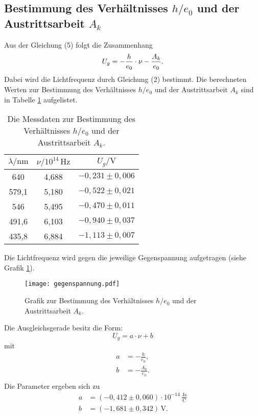\subsection{Bestimmung des Verhältnisses $h/e_0$ und der Austrittsarbeit $A_k$}
Aus der Gleichung (5) folgt die Zusammenhang
\begin{equation}
  U_g= -\frac{h}{e_0}\cdot \nu -\frac{A_k}{e_0}.\\
\end{equation}
Dabei wird die Lichtfrequenz durch Gleichung (2) bestimmt.
Die berechneten Werten zur Bestimmung des Verhältnisses $h/e_0$ und der Austrittsarbeit $A_k$ sind in Tabelle \ref{tab:Austritt} aufgelistet.
\begin{table}[H]
  \centering
  \caption{Die Messdaten zur Bestimmung des Verhältnisses $h/e_0$ und der Austrittsarbeit $A_k$.}
  \label{tab:Austritt}
  \begin{tabular}{| c | c |c|}
  \toprule
   $\lambda/\mathrm{nm}$ & $\nu/\mathrm{ 10^{14}\,Hz}$& $U_g/\mathrm{V}$  \\
  \midrule
  640&   4,688   & $  -0,231 \pm 0,006 $  \\
  579,1& 5,180 &   $  -0,522 \pm 0,021 $\\
  546 &  5,495  &  $ -0,470 \pm  0,011 $ \\
  491,6& 6,103  &  $-0,940 \pm   0,037 $  \\
  435,8& 6,884  &  $-1,113\pm    0,007 $\\
  \bottomrule
  \end{tabular}
\end{table}
\noindent
Die Lichtfrequenz wird gegen die jeweilige Gegenspannung aufgetragen (siehe Grafik \ref{fig:gegenspannung}).
\begin{figure}[H]
  \centering
  \texttt{[image: gegenspannung.pdf]}
  \caption{Grafik zur Bestimmung des Verhältnisses $h/e_0$ und der Austrittsarbeit $A_k$.}
  \label{fig:gegenspannung}
\end{figure}
\noindent
Die Ausgleichsgerade besitz die Form:
\begin{equation}
 U_g=a\cdot \nu +b 
\end{equation}
mit \begin{align*}
  a &=-\frac{h}{e_0},\\
  b&=-\frac{A_k}{e_0}.\\
\end{align*}
Die Parameter ergeben sich zu
\begin{align*}
  a &=(-0,412\pm 0,060)\cdot\mathrm{10^{-14}\,\frac{Js}{C}} \\
  b &=(-1,681 \pm 0,342 )\,\mathrm{V} .\\
 \end{align*}
